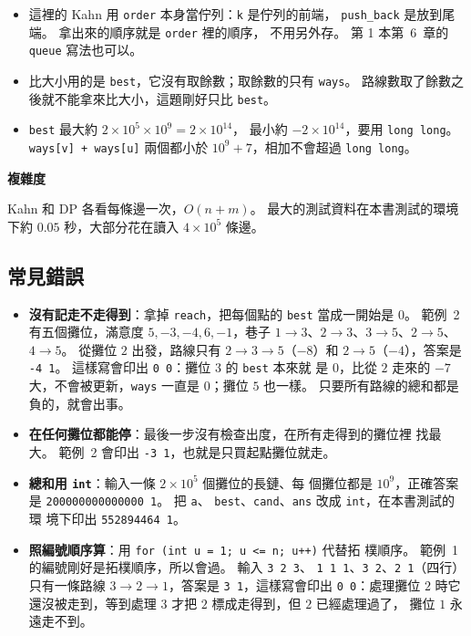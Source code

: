 
\begin{itemize}
\item 這裡的 Kahn 用 \texttt{order} 本身當佇列：\texttt{k} 是佇列的前端，
\texttt{push\_back} 是放到尾端。 拿出來的順序就是 \texttt{order} 裡的順序，
不用另外存。 第 1 本第~6~章的 \texttt{queue} 寫法也可以。
\item 比大小用的是 \texttt{best}，它沒有取餘數；取餘數的只有 \texttt{ways}。
路線數取了餘數之後就不能拿來比大小，這題剛好只比 \texttt{best}。
\item \texttt{best} 最大約 $2 \times 10^5 \times 10^9 = 2 \times 10^{14}$，
最小約 $-2 \times 10^{14}$，要用 \texttt{long long}。 \texttt{ways[v] + ways[u]}
兩個都小於 $10^9 + 7$，相加不會超過 \texttt{long long}。
\end{itemize}

\textbf{複雜度}

Kahn 和 DP 各看每條邊一次，$O(n + m)$。 最大的測試資料在本書測試的環境下約
$0.05$ 秒，大部分花在讀入 $4 \times 10^5$ 條邊。

\subsection{常見錯誤}

\begin{itemize}
\item \textbf{沒有記走不走得到}：拿掉 \texttt{reach}，把每個點的 \texttt{best}
當成一開始是 $0$。 範例~2 有五個攤位，滿意度 $5, -3, -4, 6, -1$，巷子
$1 \to 3$、$2 \to 3$、$3 \to 5$、$2 \to 5$、$4 \to 5$。 從攤位 $2$ 出發，路線只有 $2 \to 3 \to 5$（$-8$）和 $2 \to 5$（$-4$），答案是
\texttt{-4 1}。 這樣寫會印出 \texttt{0 0}：攤位 $3$ 的 \texttt{best} 本來就
是 $0$，比從 $2$ 走來的 $-7$ 大，不會被更新，\texttt{ways} 一直是 $0$；攤位
$5$ 也一樣。 只要所有路線的總和都是負的，就會出事。
\item \textbf{在任何攤位都能停}：最後一步沒有檢查出度，在所有走得到的攤位裡
找最大。 範例~2 會印出 \texttt{-3 1}，也就是只買起點攤位就走。
\item \textbf{總和用 \texttt{int}}：輸入一條 $2 \times 10^5$ 個攤位的長鏈、每
個攤位都是 $10^9$，正確答案是 \texttt{200000000000000 1}。 把 \texttt{a}、
\texttt{best}、\texttt{cand}、\texttt{ans} 改成 \texttt{int}，在本書測試的環
境下印出 \texttt{552894464 1}。
\item \textbf{照編號順序算}：用 \texttt{for (int u = 1; u <= n; u++)} 代替拓
樸順序。 範例~1 的編號剛好是拓樸順序，所以會過。 輸入 \texttt{3 2 3}、
\texttt{1 1 1}、\texttt{3 2}、\texttt{2 1}（四行）只有一條路線
$3 \to 2 \to 1$，答案是 \texttt{3 1}，這樣寫會印出 \texttt{0 0}：處理攤位
$2$ 時它還沒被走到，等到處理 $3$ 才把 $2$ 標成走得到，但 $2$ 已經處理過了，
攤位 $1$ 永遠走不到。
\end{itemize}

